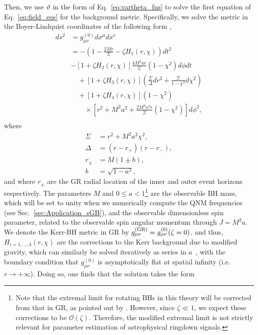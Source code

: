 \documentclass[aps,prx,amsmath,floats,floatfix,twocolumn,
  superscriptaddress,nofootinbib,showpacs]{revtex4-1}
\begin{document}
Then, we use $\vartheta$ in the form of Eq.~\eqref{eq:vartheta_fns} to solve the first equation of Eq.~\eqref{eq:field_eqs} for the background metric.
Specifically, we solve the metric in the Boyer-Lindquist coordinates of the following form  \cite{Cano_Ruiperez_2019, Cano:2023jbk}, 
\begin{equation}\label{eq:metric}
\begin{split}
ds^2 &= g_{\mu \nu}^{(0)} dx^{\mu}  dx^{\nu} \\
& = - \left( 1-\frac{2 M r}{\Sigma} - \zeta H_1(r, \chi)\right) dt^2 \\
& - \left[ 1 + \zeta H_2(r, \chi) \right] \frac{4 M^2 a r}{\Sigma} (1 - \chi^2) d \phi dt \\
& \quad + \left[ 1 + \zeta H_3(r, \chi) \right] \left( \frac{\Sigma}{\Delta} dr^2 + \frac{\Sigma}{1 - \chi^2} d \chi^2 \right) \\
& \quad + \left[ 1 + \zeta H_4(r, \chi) \right](1-\chi^2) \\
& \quad \quad \times \left[r^{2} + M^2 a^{2}+\frac{2 M^3 a^{2} r}{\Sigma} (1 - \chi^2)\right] d\phi^2, \\
\end{split}
\end{equation}
where
\begin{equation}\label{eq:metric_quantities}
\begin{split}
\Sigma &= r^2 + M^2 a^2 \chi^2, \\
\Delta &= (r-r_+)(r-r_-), \\
r_{\pm} &= M(1 \pm b), \\
b &= \sqrt{1-a^2},
\end{split}
\end{equation}
and where $r_{\pm}$ are the GR radial location of the inner and outer event horizons respectively. The parameters $M$ and $0\leq a<1$\footnote{Note that the extremal limit for rotating BHs in this theory will be corrected from that in GR, as pointed out by \cite{Cano:2023jbk}. However, since $\zeta \ll 1$, we expect these corrections to be $\mathcal{O}(\zeta)$. Therefore, the modified extremal limit is not strictly relevant for parameter estimation of astrophysical ringdown signals. }
are the observable BH mass, which will be set to unity when we numerically compute the QNM frequencies (see Sec.~\ref{sec:Application_sGB}), and the observable dimensionless spin parameter, related to the observable spin angular momentum through $J = M^2 a$.
We denote the Kerr-BH metric in GR by $g^{\rm (GR)}_{\mu \nu} = g^{\rm (0)}_{\mu \nu}( \zeta = 0)$, and thus, $H_{i=1, ..., 4}(r, \chi)$ are the corrections to the Kerr background due to modified gravity, which can similarly be solved iteratively as series in $a$~\cite{Cano_Ruiperez_2019, Cano:2023jbk}, with the boundary condition that $g_{\mu \nu}^{(0)}$ is asymptotically flat at spatial infinity (i.e. $r \rightarrow + \infty$). Doing so, one finds that the solution takes the form
\end{document}
